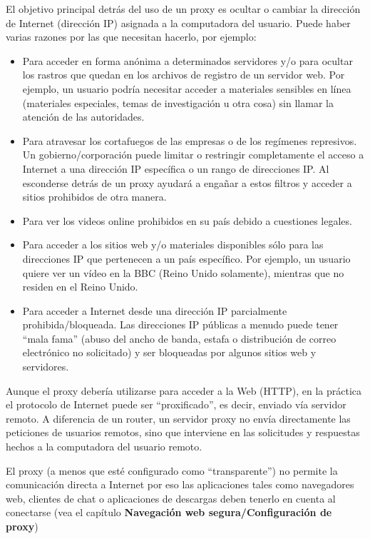 \documentclass[10pt,a5paper,twoside,,]{book}
\providecommand{\tightlist}{%
  \setlength{\itemsep}{0pt}\setlength{\parskip}{0pt}}
\begin{document}
El objetivo principal detrás del uso de un proxy es ocultar o cambiar la
dirección de Internet (dirección IP) asignada a la computadora del
usuario. Puede haber varias razones por las que necesitan hacerlo, por
ejemplo:

\begin{itemize}
\tightlist
\item
  Para acceder en forma anónima a determinados servidores y/o para
  ocultar los rastros que quedan en los archivos de registro de un
  servidor web. Por ejemplo, un usuario podría necesitar acceder a
  materiales sensibles en línea (materiales especiales, temas de
  investigación u otra cosa) sin llamar la atención de las autoridades.
\item
  Para atravesar los cortafuegos de las empresas o de los regímenes
  represivos. Un gobierno/corporación puede limitar o restringir
  completamente el acceso a Internet a una dirección IP específica o un
  rango de direcciones IP. Al esconderse detrás de un proxy ayudará a
  engañar a estos filtros y acceder a sitios prohibidos de otra manera.
\item
  Para ver los videos online prohibidos en su país debido a cuestiones
  legales.
\item
  Para acceder a los sitios web y/o materiales disponibles sólo para las
  direcciones IP que pertenecen a un país específico. Por ejemplo, un
  usuario quiere ver un vídeo en la BBC (Reino Unido solamente),
  mientras que no residen en el Reino Unido.
\item
  Para acceder a Internet desde una dirección IP parcialmente
  prohibida/bloqueada. Las direcciones IP públicas a menudo puede tener
  ``mala fama'' (abuso del ancho de banda, estafa o distribución de
  correo electrónico no solicitado) y ser bloqueadas por algunos sitios
  web y servidores.
\end{itemize}

Aunque el proxy debería utilizarse para acceder a la Web (HTTP), en la
práctica el protocolo de Internet puede ser ``proxificado'', es decir,
enviado vía servidor remoto. A diferencia de un router, un servidor
proxy no envía directamente las peticiones de usuarios remotos, sino que
interviene en las solicitudes y respuestas hechos a la computadora del
usuario remoto.

El proxy (a menos que esté configurado como ``transparente'') no permite
la comunicación directa a Internet por eso las aplicaciones tales como
navegadores web, clientes de chat o aplicaciones de descargas deben
tenerlo en cuenta al conectarse (vea el capítulo \textbf{Navegación web
segura/Configuración de proxy})
\end{document}
